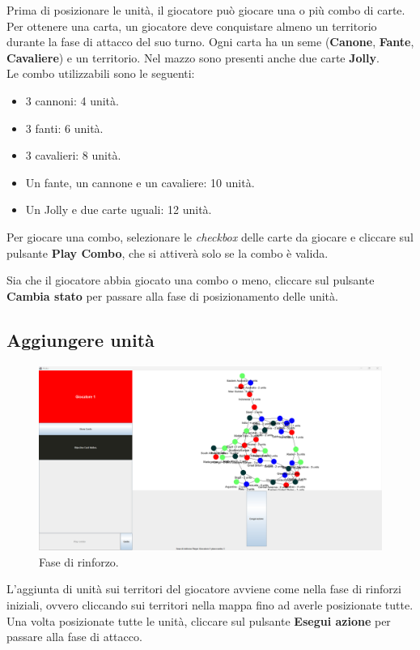 \documentclass[a4paper,12pt]{report}
\begin{document}
Prima di posizionare le unità, il giocatore può giocare una o più combo di carte. Per ottenere una carta, un giocatore deve conquistare almeno un territorio durante la fase di attacco del suo turno.
Ogni carta ha un seme (\textbf{Canone}, \textbf{Fante}, \textbf{Cavaliere}) e un territorio.
Nel mazzo sono presenti anche due carte \textbf{Jolly}.
\\
Le combo utilizzabili sono le seguenti:
\begin{itemize}
	\item 3 cannoni: 4 unità.
	\item 3 fanti: 6 unità.
	\item 3 cavalieri: 8 unità.
	\item Un fante, un cannone e un cavaliere: 10 unità.
	\item Un Jolly e due carte uguali: 12 unità.
\end{itemize}
Per giocare una combo, selezionare le \textit{checkbox} delle carte da giocare e cliccare sul pulsante \textbf{Play Combo}, che si attiverà solo se la combo è valida.

Sia che il giocatore abbia giocato una combo o meno, cliccare sul pulsante \textbf{Cambia stato} per passare alla fase di posizionamento delle unità.
\subsection{Aggiungere unità}
\begin{figure}[H]
	\centering
	\includegraphics[width=1\textwidth]{user_guide/8_reinforcements.png}
	\caption{Fase di rinforzo.}
\end{figure}
L'aggiunta di unità sui territori del giocatore avviene come nella fase di rinforzi iniziali, ovvero cliccando sui territori nella mappa fino ad averle posizionate tutte.
Una volta posizionate tutte le unità, cliccare sul pulsante \textbf{Esegui azione} per passare alla fase di attacco.
\end{document}
